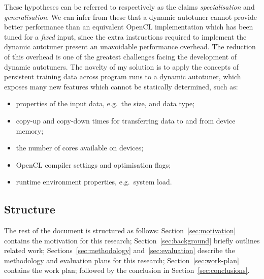 These hypotheses can be referred to respectively as the claims
\emph{specialisation} and \emph{generalisation}. We can infer from
these that a dynamic autotuner cannot provide better performance than
an equivalent OpenCL implementation which has been tuned for a
\emph{fixed} input, since the extra instructions required to implement
the dynamic autotuner present an unavoidable performance overhead. The
reduction of this overhead is one of the greatest challenges facing
the development of dynamic autotuners. The novelty of my solution is
to apply the concepts of persistent training data across program runs
to a dynamic autotuner, which exposes many new features which cannot
be statically determined, such as:

\begin{itemize}
\itemsep0em
\item properties of the input data, e.g.\ the size, and data type;
\item copy-up and copy-down times for transferring data to and from
  device memory;
\item the number of cores available on devices;
\item OpenCL compiler settings and optimisation flags;
\item runtime environment properties, e.g.\ system load.
\end{itemize}

\subsection{Structure}
The rest of the document is structured as follows:
Section~\ref{sec:motivation} contains the motivation for this
research; Section~\ref{sec:background} briefly outlines related work;
Sections~\ref{sec:methodology} and~\ref{sec:evaluation} describe the
methodology and evaluation plans for this research;
Section~\ref{sec:work-plan} contains the work plan; followed by the
conclusion in Section~\ref{sec:conclusions}.
